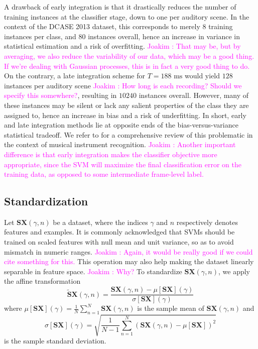 \documentclass[journal]{IEEEtran}
\newcommand{\ja}[1]{\textcolor{magenta}{Joakim : #1}}
\begin{document}
A drawback of early integration is that it drastically reduces the number of training instances at the classifier stage, down to one per auditory scene.
In the context of the DCASE 2013 dataset, this corresponds to merely $8$ training instances per class, and $80$ instances overall, hence an increase in variance in statistical estimation and a risk of overfitting. \ja{That may be, but by averaging, we also reduce the variability of our data, which may be a good thing. If we're dealing with Gaussian processes, this is in fact a very good thing to do.}
On the contrary, a late integration scheme for $T=188\textrm{ ms}$ would yield $128$ instances per auditory scene \ja{How long is each recording? Should we specify this somewhere?}, resulting in $10240$ instances overall.
However, many of these instances may be silent or lack any salient properties of the class they are assigned to, hence an increase in bias and a risk of underfitting.
In short, early and late integration methods lie at opposite ends of the bias-versus-variance statistical tradeoff. We refer to \cite{Joder2009} for a comprehensive review of this problematic in the context of musical instrument recognition. \ja{Another important difference is that early integration makes the classifier objective more appropriate, since the SVM will maximize the final classification error on the training data, as opposed to some intermediate frame-level label.}

\subsection{Standardization}
\label{sec:stand}

Let $\mathbf{S}\boldsymbol{X}(\gamma,n)$ be a dataset, where the indices $\gamma$ and $n$ respectively denotes features and examples.
It is commonly acknowledged that SVMs should be trained on scaled features with null mean and unit variance, so as to avoid mismatch in numeric ranges. \ja{Again, it would be really good if we could cite something for this.}
This operation may also help making the dataset linearly separable in feature space. \ja{Why?}
To standardize $\mathbf{S}\boldsymbol{X}(\gamma,n)$, we apply the affine transformation
\begin{equation}
\widetilde{\mathbf{S}}\boldsymbol{X}(\gamma, n) =
\dfrac{ \mathbf{S}\boldsymbol{X}(\gamma, n) -
\mu[ \mathbf{S}\boldsymbol{X}](\gamma)}{\sigma[ \mathbf{S}\boldsymbol{X}](\gamma)}
\end{equation}
where $\mu[ \mathbf{S}\boldsymbol{X}](\gamma) = \frac{1}{N} \sum_{n=1}^{N} \mathbf{S}\boldsymbol{X}(\gamma,n)$ is the sample mean of $\mathbf{S}\boldsymbol{X}(\gamma,n)$ and
\begin{equation}
\sigma[\mathbf{S}\boldsymbol{X}] (\gamma) =
\sqrt{\frac{1}{N-1} \sum_{n=1}^{N}
\left( \mathbf{S}\boldsymbol{X}(\gamma,n) - \mu[\mathbf{S}\boldsymbol{X}] \right)^2}
\end{equation}
is the sample standard deviation.
\end{document}
